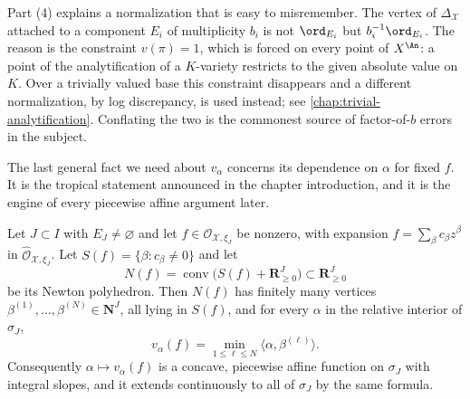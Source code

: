 \begin{remark}
\label{rem:divisorial-normalization}
Part (4) explains a normalization that is easy to misremember. The vertex
of $\Delta_{\mathcal X}$ attached to a component $E_i$ of multiplicity
$b_i$ is not $\ord_{E_i}$ but $b_i^{-1}\ord_{E_i}$. The reason is the
constraint $v(\pi)=1$, which is forced on every point of $X^{\An}$: a
point of the analytification of a $K$-variety restricts to the given
absolute value on $K$. Over a trivially valued base this constraint
disappears and a different normalization, by log discrepancy, is used
instead; see \cref{chap:trivial-analytification}. Conflating the two is the
commonest source of factor-of-$b$ errors in the subject.
\end{remark}

The last general fact we need about $v_\alpha$ concerns its dependence on
$\alpha$ for fixed $f$. It is the tropical statement announced in the
chapter introduction, and it is the engine of every piecewise affine
argument later.

\begin{lemma}
\label{lem:monomial-newton}
Let $J\subset I$ with $E_J\neq\varnothing$ and let
$f\in\mathcal O_{\mathcal X,\xi_J}$ be nonzero, with expansion
$f=\sum_\beta c_\beta z^\beta$ in
$\widehat{\mathcal O}_{\mathcal X,\xi_J}$. Let
$S(f)=\{\beta:c_\beta\neq0\}$ and let
\[
 N(f)=\operatorname{conv}\bigl(S(f)+\mathbf R_{\geq0}^J\bigr)
 \subset\mathbf R_{\geq0}^J
\]
be its Newton polyhedron. Then $N(f)$ has finitely many vertices
$\beta^{(1)},\ldots,\beta^{(N)}\in\mathbf N^J$, all lying in $S(f)$, and
for every $\alpha$ in the relative interior of $\sigma_J$,
\[
 v_\alpha(f)
 =\min_{1\le\ell\le N}\langle\alpha,\beta^{(\ell)}\rangle .
\]
Consequently $\alpha\mapsto v_\alpha(f)$ is a concave, piecewise affine
function on $\sigma_J$ with integral slopes, and it extends continuously
to all of $\sigma_J$ by the same formula.
\end{lemma}

